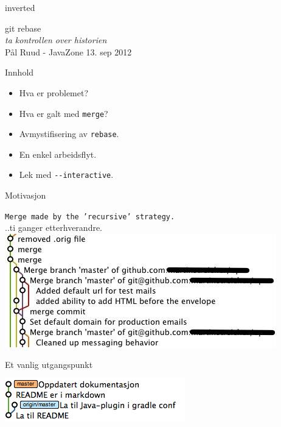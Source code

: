 \documentclass{beamer}
\begin{document}
\begin{frame}
    \begin{beamercolorbox}[ignorebg]{inverted}
    \begin{center}
        \Huge{git rebase}\\
        \vspace{0.5cm}
        \large{\emph{ta kontrollen over historien}}\\
        \vspace{1cm}
        \small{Pål Ruud - JavaZone 13. sep 2012}
    \end{center}
    \end{beamercolorbox}%
\end{frame}

\begin{frame}{Innhold}
    \begin{itemize}
        \item Hva er problemet?
        \item Hva er galt med \lstinline$merge$?
        \item Avmystifisering av \lstinline$rebase$.
        \item En enkel arbeidsflyt.
        \item Lek med \lstinline$--interactive$.
    \end{itemize}
\end{frame}

\begin{frame}{Motivasjon}
    \begin{center}
        \texttt{Merge made by the 'recursive' strategy.}\\
        \pause
        ..ti ganger etterhverandre.
        \medskip
        \pause
        \includegraphics[scale=0.7]{merge_commits.jpg}
    \end{center}
\end{frame}

\begin{frame}{Et vanlig utgangspunkt}
    \begin{center}
        \includegraphics[scale=0.7]{1.png}
    \end{center}
\end{frame}
\end{document}
